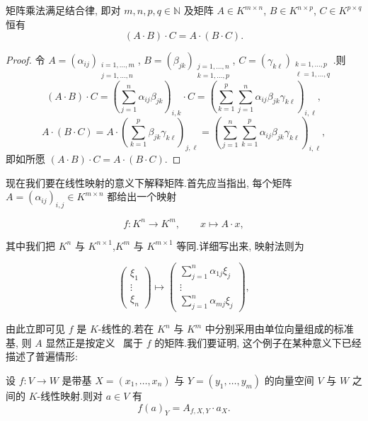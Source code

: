 \begin{remark}[矩阵乘法的结合律]\label{rem:3.1.6}
矩阵乘法满足结合律, 即对 $m, n, p, q \in \mathbb{N}$ 及矩阵 $A \in K^{m \times n}$, $B \in K^{n \times p}$, $C \in K^{p \times q}$ 恒有
\[
(A \cdot B) \cdot C = A \cdot (B \cdot C)\text{.}
\]
\end{remark}

\begin{proof}
令 $A = (\alpha_{ij})_{\substack{i = 1, \ldots, m\\ j = 1, \ldots, n}}$, $B = (\beta_{jk})_{\substack{j = 1, \ldots, n\\ k = 1, \ldots, p}}$, $C = (\gamma_{k\ell})_{\substack{k = 1, \ldots, p\\ \ell = 1, \ldots, q}}$.则
\[
(A \cdot B) \cdot C = \left(\sum_{j = 1}^{n}\alpha_{ij}\beta_{jk}\right)_{i, k} \cdot C
= \left(\sum_{k = 1}^{p}\sum_{j = 1}^{n}\alpha_{ij}\beta_{jk}\gamma_{k\ell}\right)_{i, \ell},
\]
\[
A \cdot (B \cdot C) = A \cdot \left(\sum_{k = 1}^{p}\beta_{jk}\gamma_{k\ell}\right)_{j, \ell}
= \left(\sum_{j = 1}^{n}\sum_{k = 1}^{p}\alpha_{ij}\beta_{jk}\gamma_{k\ell}\right)_{i, \ell},
\]
即如所愿 $(A \cdot B) \cdot C = A \cdot (B \cdot C)$.
\end{proof}

现在我们要在线性映射的意义下解释矩阵.首先应当指出, 每个矩阵 $A = (\alpha_{ij})_{i, j} \in K^{m \times n}$ 都给出一个映射

\[
f \colon K^n \longrightarrow K^m, \qquad x \longmapsto A \cdot x,
\]

其中我们把 $K^n$ 与 $K^{n \times 1}$,$K^m$ 与 $K^{m \times 1}$ 等同.详细写出来, 映射法则为

\[
\begin{pmatrix} \xi_1 \\ \vdots \\ \xi_n \end{pmatrix}
\longmapsto
\begin{pmatrix}
\sum_{j = 1}^{n}\alpha_{1j}\xi_j \\
\vdots \\
\sum_{j = 1}^{n}\alpha_{mj}\xi_j
\end{pmatrix},
\]

由此立即可见 $f$ 是 $K$-线性的.若在 $K^n$ 与 $K^m$ 中分别采用由单位向量组成的标准基, 则 $A$ 显然正是按定义~ 属于 $f$ 的矩阵.我们要证明, 这个例子在某种意义下已经描述了普遍情形:

\begin{theorem}\label{thm:3.1.7}
设 $f \colon V \longrightarrow W$ 是带基 $X = (x_1, \ldots, x_n)$ 与 $Y = (y_1, \ldots, y_m)$ 的向量空间 $V$ 与 $W$ 之间的 $K$-线性映射.则对 $a \in V$ 有
\[
f(a)_Y = A_{f, X, Y} \cdot a_X\text{.}
\]
\end{theorem}

